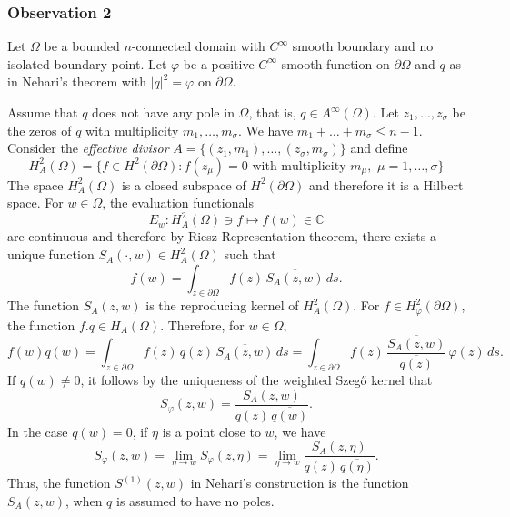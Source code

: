 \documentclass[11pt, reqno]{amsart}
\numberwithin{equation}{section}
\newcommand{\pa}{\partial}
\newcommand{\Om}{\Omega}
\begin{document}
\subsubsection{\bf{Observation 2}}

\medskip

Let $\Om$ be a bounded $n$-connected domain with $C^{\infty}$ smooth boundary and no isolated boundary point. Let $\varphi$ be a positive $C^{\infty}$ smooth function on $\partial\Om$ and $q$ as in Nehari's theorem with $\vert q \vert^2 = \varphi$ on $\pa \Om$.

\medskip

Assume that $q$ does not have any pole in $\Om$, that is, $q\in A^{\infty}(\Om)$. Let $z_1,\ldots,z_{\sigma}$ be the zeros of $q$ with multiplicity $m_1,\ldots,m_{\sigma}$. We have $m_1 + \ldots+m_{\sigma}\leq n-1$. Consider the \textit{effective divisor} $A=\{(z_1,m_1),\ldots,(z_{\sigma},m_{\sigma})\}$ and define 
\begin{equation}
H_{A}^2(\Omega) = \{f\in H^2(\partial\Omega): f(z_{\mu}) = 0 \text{ with multiplicity }m_{\mu}, \,\,\mu = 1,\ldots,\sigma\}
\end{equation}
The space $H_{A}^2(\Omega)$ is a closed subspace of $H^2(\partial\Om)$ and therefore it is a Hilbert space. For $w\in\Om$, the evaluation functionals 
\[
E_w: H_{A}^2(\Om) \ni f \mapsto f(w) \in \mathbb{C}
\]
are continuous and therefore by Riesz Representation theorem, there exists a unique function $S_{A}(\cdot,w)\in H_{A}^2(\Om)$ such that
\begin{equation}
f(w) = \int_{z\in\partial\Om} f(z) \,\overline{S_{A}(z,w)}\, ds.
\end{equation}
The function $S_{A}(z,w)$ is the reproducing kernel of $H_{A}^2(\Om)$. For $f\in H^2_{\varphi}(\partial\Om)$, the function $f.q \in H_{A}(\Om)$. Therefore, for $w\in\Om$,
\[
f(w) q(w) = \int_{z\in\partial\Om}  f(z)\,q(z) \,\overline{S_{A}(z,w)}\,ds 
=
\int_{z\in\partial\Om}  f(z)\,\frac{\overline{S_{A}(z,w)}}{\overline{q(z)}}\,\varphi(z)\,ds.
\]
If $q(w)\neq 0$, it follows by the uniqueness of the weighted Szeg\H{o} kernel that
\begin{equation}
S_{\varphi}(z,w) = \frac{S_{A}(z,w)}{q(z)\,\overline{q(w)}}.
\end{equation}
In the case $q(w) = 0$, if $\eta$ is a point close to $w$, we have
\begin{equation}
S_{\varphi}(z,w) = \lim\limits_{\eta\rightarrow w} S_{\varphi}(z,\eta) = 
 \lim\limits_{\eta\rightarrow w} \frac{S_{A}(z,\eta)}{q(z)\,\overline{q(\eta)}}.
\end{equation}
Thus, the function $S^{(1)}(z,w)$ in Nehari's construction is the function $S_{A}(z,w)$, when $q$ is assumed to have no poles. 
\end{document}
